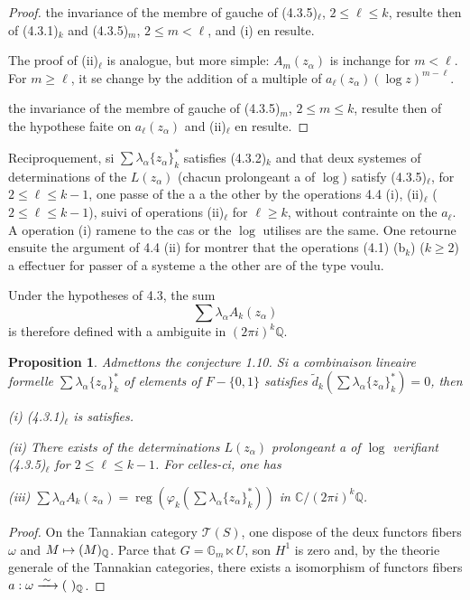\documentclass[12pt,a4paper]{article}
\theoremstyle{plain}
\newtheorem{proposition}{Proposition}[section]
\theoremstyle{definition}
\theoremstyle{remark}
\DeclareMathOperator{\reg}{reg}
\newcommand{\Q}{\mathbb{Q}}
\newcommand{\C}{\mathbb{C}}
\newcommand{\Gm}{\mathbb{G}_m}
\begin{document}
{{\begin{proof}
the invariance of the membre of gauche of (4.3.5)$_\ell$, $2\leq\ell\leq k$, resulte then of (4.3.1)$_k$ and (4.3.5)$_m$, $2\leq m<\ell$, and (i) en resulte.

The proof of (ii)$_\ell$ is analogue, but more simple: $A_m(z_\alpha)$ is inchange for $m<\ell$. For $m\geq\ell$, it se change by the addition of a multiple of $a_\ell(z_\alpha)(\log z)^{m-\ell}$.

the invariance of the membre of gauche of (4.3.5)$_m$, $2\leq m\leq k$, resulte then of the hypothese faite on $a_\ell(z_\alpha)$ and (ii)$_\ell$ en resulte.
\end{proof}

Reciproquement, si $\sum\lambda_\alpha\{z_\alpha\}_k^*$ satisfies (4.3.2)$_k$ and that deux systemes of determinations of the $L(z_\alpha)$ (chacun prolongeant a of $\log$) satisfy (4.3.5)$_\ell$, for $2\leq\ell\leq k-1$, one passe of the a {a} the other by the operations 4.4 (i), (ii)$_\ell$ ($2\leq\ell\leq k-1$), suivi of operations (ii)$_\ell$ for $\ell\geq k$, without contrainte on the $a_\ell$. A operation (i) ramene to the cas or the $\log$ utilises are the same. One retourne ensuite the argument of 4.4 (ii) for montrer that the operations (4.1) (b$_k$) ($k\geq 2$) {a} effectuer for passer of a systeme {a} the other are of the type voulu.

Under the hypotheses of 4.3, the sum
\begin{equation*}
\sum\lambda_\alpha A_k(z_\alpha)
\end{equation*}
is therefore defined with a ambiguite in $(2\pi i)^k\Q$.

\begin{proposition}
Admettons the conjecture 1.10. Si a combinaison lineaire formelle $\sum\lambda_\alpha\{z_\alpha\}_k^*$ of elements of $F-\{0,1\}$ satisfies $\tilde{d}_k(\sum\lambda_\alpha\{z_\alpha\}_k^*)=0$, then

\textup{(i)} (4.3.1)$_\ell$ is satisfies.

\textup{(ii)} There exists of the determinations $L(z_\alpha)$ prolongeant a of $\log$ verifiant (4.3.5)$_\ell$ for $2\leq\ell\leq k-1$. For celles-ci, one has

\textup{(iii)} $\sum\lambda_\alpha A_k(z_\alpha)=\reg(\varphi_k(\sum\lambda_\alpha\{z_\alpha\}_k^*))$ in $\C/(2\pi i)^k\Q$.
\end{proposition}

\begin{proof}
On the Tannakian category $\mathcal{T}(S)$, one dispose of the deux functors fibers $\omega$ and $M\mapsto\real(M)_\Q$. Parce that $G=\Gm\ltimes U$, son $H^1$ is zero and, by the theorie generale of the Tannakian categories, there exists a isomorphism of functors fibers $a:\omega\xrightarrow{\;\sim\;}\real(\ )_\Q$.


\end{proof}}}
\end{document}
